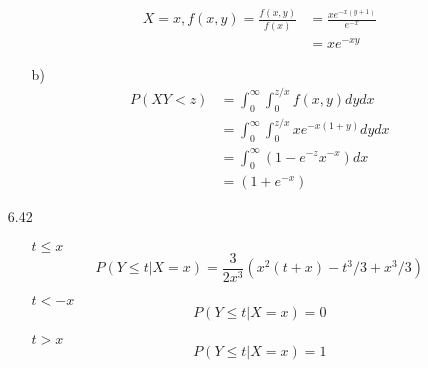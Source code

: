 \documentclass{article}
\begin{document}
\begin{itemize}
\begin{itemize}
\begin{align*}
            X=x,f(x,y)=\frac{f(x,y)}{f(x)}&=\frac{xe^{-x(y+1)}}{e^{-x}}\\
            &=xe^{-xy}
        \end{align*}
        \item [b)]
        \begin{align*}
            P(XY<z)&=\int_{0}^{\infty}\int_{0}^{z/x} f(x,y)dydx\\
            &=\int_{0}^{\infty}\int_{0}^{z/x} xe^{-x(1+y)}dydx\\
            &=\int_{0}^{\infty}(1-e^{-z}x^{-x})dx\\
            &=(1+e^{-x})
        \end{align*}
    \end{itemize}
    \item [6.42]\
    \begin{itemize}
        \item [\(t\leq x\)] \[P(Y\leq t|X=x)=\frac{3}{2x^3}(x^2(t+x)-t^3/3+x^3/3)\]
        \item [\(t<-x\)] \[P(Y\leq t|X=x)=0\]
        \item [\(t>x\)] \[P(Y\leq t|X=x)=1\]
    \end{itemize}
\end{itemize}
\end{document}
